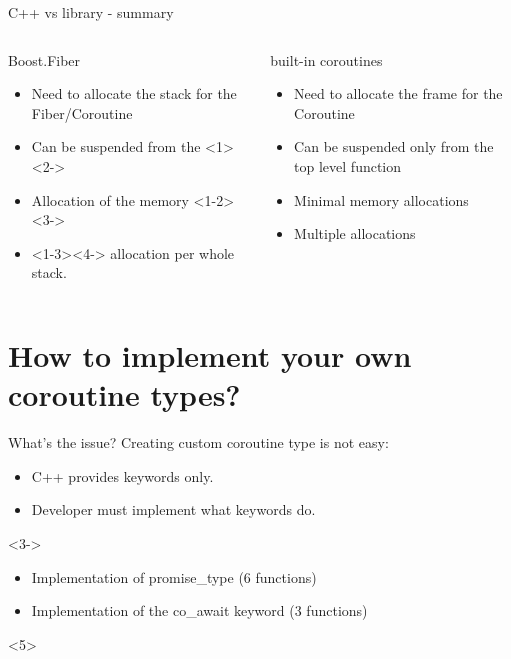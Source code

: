 \documentclass[10pt]{beamer}
\begin{document}
\begin{frame}{C++ vs library - summary}
\begin{columns}[t]
  \begin{column}{0.48\linewidth}

  \centerline{\alert{Boost.Fiber}}
  \vfill
  \begin{itemize}
  \item Need to allocate \alert{the stack} for the Fiber/Coroutine
  \item Can be suspended from the <1><2->
  \item Allocation of the memory <1-2><3->
  \item {}<1-3><4-> allocation per whole stack.
  \end{itemize}
  \end{column}
  \begin{column}{0.48\linewidth}

  \centerline{\alert{built-in coroutines}}
  \vfill
  \begin{itemize}[<+->]
  \item Need to allocate \alert{the frame} for the Coroutine
  \item Can be suspended only from the \alert{top level function}
  \item \alert{Minimal} memory allocations 
  \item \alert{Multiple} allocations
  \end{itemize}
  \end{column}
  
  \end{columns}
\end{frame}

\section{How to implement your own coroutine types?}

\begin{frame}{What's the issue?}
	Creating custom coroutine type is not easy:
	\begin{itemize}[<+->]
		\item C++ provides keywords \alert{only}.
		\item \alert{Developer must implement} what keywords do.
	\end{itemize}

	\vfill

	<3->
	\begin{itemize}[<+->]
		\item Implementation of promise\_type ({\selectfont\texttildelow}6 functions)
		\item Implementation of the co\_await  keyword ({\selectfont\texttildelow}3 functions)
	\end{itemize}

	\vfill

\end{frame}
\end{document}
